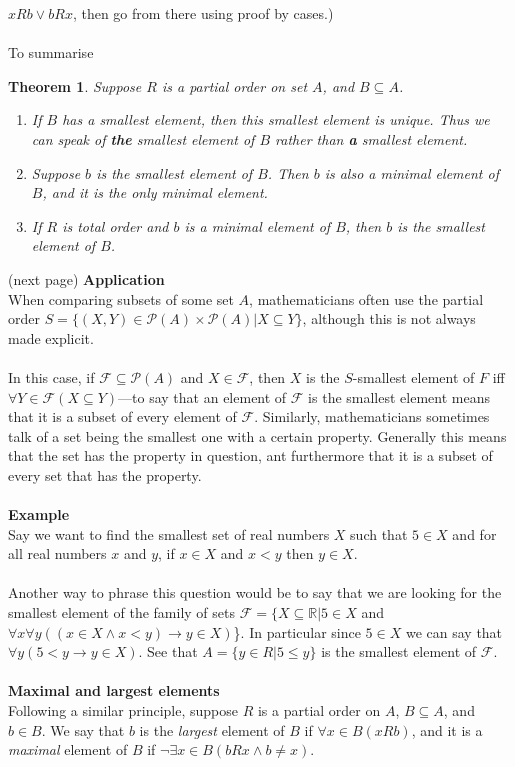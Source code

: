 \documentclass{report}
\newtheorem*{theorem}{Theorem}
\theoremstyle{definition}
\begin{document}
$xRb\lor bRx$, then go from there using proof by cases.)\\
\vspace{1mm}\\
To summarise
\begin{theorem}
Suppose $R$ is a partial order on set $A$, and $B\subseteq A$.
\begin{enumerate}
\item If $B$ has a smallest element, then this smallest element is unique. Thus we can speak of \textbf{the} smallest element of $B$ rather than \textbf{a} smallest element.
\item Suppose $b$ is the smallest element of $B$. Then $b$ is also a minimal element of $B$, and it is the only minimal element. 
\item If $R$ is total order and $b$ is a minimal element of $B$, then $b$ is the smallest element of $B$.
\end{enumerate}
\end{theorem}
\noindent(next page)\newpage
\noindent\textbf{Application}\\
When comparing subsets of some set $A$, mathematicians often use the partial order $S=\{(X,Y)\in\mathscr P(A)\times\mathscr P(A)|X\subseteq Y\}$, although this is not always made explicit.\\
\vspace{1mm}\\
In this case, if $\mathcal F\subseteq\mathscr P(A)$ and $X\in\mathcal F$, then $X$ is the $S$-smallest element of $F$ iff $\forall Y\in\mathcal F(X\subseteq Y)$---to say that an element of
$\mathcal F$ is the smallest element means that it is a subset of every element of $\mathcal F$. Similarly, mathematicians sometimes talk of a set being the smallest one with a certain
property. Generally this means that the set has the property in question, ant furthermore that it is a subset of every set that has the property.\\
\vspace{1mm}\\
\textbf{Example}\\
Say we want to find the smallest set of real numbers $X$ such that $5\in X$ and for all real numbers $x$ and $y$, if $x\in X$ and $x<y$ then $y\in X$.\\
\vspace{1mm}\\
Another way to phrase this question would be to say that we are looking for the smallest element of the family of sets $\mathcal F=\{X\subseteq\mathbb R|5\in X$ and 
$\forall x\forall y((x\in X\land x<y)\to y\in X)$\}. In particular since $5\in X$ we can say that $\forall y(5<y\to y\in X)$. See that $A=\{y\in R|5\leq y\}$ is the smallest element of $\mathcal F$.\\\vspace{1mm}\\
\textbf{Maximal and largest elements}\\
Following a similar principle, suppose $R$ is a partial order on $A$, $B\subseteq A$, and $b\in B$.
We say that $b$ is the \textit{largest} element of $B$ if $\forall x\in B(xRb)$, and it is a
\textit{maximal} element of $B$ if $\neg\exists x\in B(bRx\land b\neq x)$.
\newpage
\end{document}
